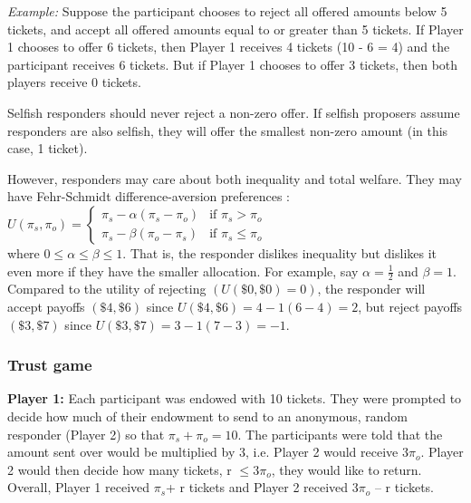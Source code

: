 \documentclass[12pt]{article}
\begin{document}
\textit{Example:} Suppose the participant chooses to reject all offered amounts below 5 tickets, and accept all offered amounts equal to or greater than 5 tickets. If Player 1 chooses to offer 6 tickets, then Player 1 receives 4 tickets (10 - 6 = 4) and the participant receives 6 tickets. But if Player 1 chooses to offer 3 tickets, then both players receive 0 tickets. 

Selfish responders should never reject a non-zero offer. If selfish proposers assume responders are also selfish, they will offer the smallest non-zero amount (in this case, 1 ticket).


However, responders may care about both inequality and total welfare. They may have Fehr-Schmidt difference-aversion preferences :\\

$ U(\pi_{s}, \pi_{o})  = \begin{cases}
      \pi_{s} - \alpha(\pi_{s} - \pi_{o}) & \text{if }\pi_{s} > \pi_{o} \\
      \pi_{s} - \beta(\pi_{o} - \pi_{s}) & \text{if }\pi_{s} \leq \pi_{o}
    \end{cases}\, $ \\

\noindent where $ 0 \leq \alpha \leq \beta \leq 1$. That is, the responder dislikes inequality but dislikes it even more if they have the smaller allocation. For example, say $\alpha = \frac{1}{2}$ and $\beta=1$. Compared to the utility of rejecting \((U(\$0, \$0) = 0)\), the responder will accept payoffs \((\$4, \$6)\) since \(U(\$4, \$6) = 4 - 1(6 - 4) =  2\), but reject payoffs \((\$3, \$7)\) since \(U(\$3,  \$7) = 3 - 1(7 - 3) = -1\).

	
\subsubsection{Trust game}
\textbf{Player 1:} Each participant was endowed with 10 tickets. They were prompted to decide how much of their endowment to send to an anonymous, random responder (Player 2) so that \(\pi_{s} + \pi_{o} = 10\). The participants were told that the amount sent over would be multiplied by 3, i.e. Player 2 would receive 3\(\pi_{o}\). Player 2 would then decide how many tickets, r \(\leq 3\pi_{o}\), they would like to return. Overall, Player 1 received \(\pi_{s}\)+ r tickets and Player 2 received 3\(\pi_{o}\) -- r tickets.
\end{document}
